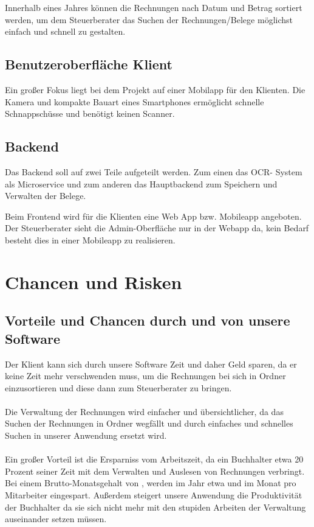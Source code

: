 \documentclass[12pt]{article}
\theoremstyle{definition}
\newcommand*{\skippingparagraph}{\par\vspace{\baselineskip}\noindent}
\begin{document}
\noindent Innerhalb eines Jahres können die Rechnungen nach Datum und Betrag sortiert werden, um dem Steuerberater das Suchen der Rechnungen/Belege möglichst einfach und schnell zu gestalten.
\par

\pagebreak
\subsection{Benutzeroberfläche Klient}
Ein großer Fokus liegt bei dem Projekt auf einer Mobilapp für den Klienten. Die Kamera und kompakte Bauart eines Smartphones ermöglicht schnelle Schnappschüsse und benötigt keinen Scanner.


\pagebreak
\subsection{Backend}
Das Backend soll auf zwei Teile aufgeteilt werden. Zum einen das OCR- System als Microservice und zum anderen das Hauptbackend zum Speichern und Verwalten der Belege.
\skippingparagraph
Beim Frontend wird für die Klienten eine Web App bzw. Mobileapp angeboten. Der Steuerberater sieht die Admin-Oberfläche nur in der Webapp da, kein Bedarf besteht dies in einer Mobileapp zu realisieren.

\pagebreak


\section{Chancen und Risken}

\subsection{Vorteile und Chancen durch und von unsere Software}

Der Klient kann sich durch unsere Software Zeit und daher Geld sparen, da er keine Zeit mehr verschwenden muss, um die Rechnungen bei sich in Ordner einzusortieren und diese dann zum Steuerberater zu bringen.\\ \\
Die Verwaltung der Rechnungen wird einfacher und übersichtlicher, da das Suchen der Rechnungen in Ordner wegfällt und durch einfaches und schnelles Suchen in unserer Anwendung ersetzt wird.\\ \\
Ein großer Vorteil ist die Ersparniss vom Arbeitszeit, da ein Buchhalter etwa 20 Prozent seiner Zeit mit dem Verwalten und Auslesen von Rechnungen verbringt. Bei einem Brutto-Monatsgehalt von , werden im Jahr etwa  und im Monat  pro Mitarbeiter eingespart. Außerdem steigert unsere Anwendung die Produktivität der Buchhalter da sie sich nicht mehr mit den stupiden Arbeiten der Verwaltung auseinander setzen müssen.\\
\end{document}
